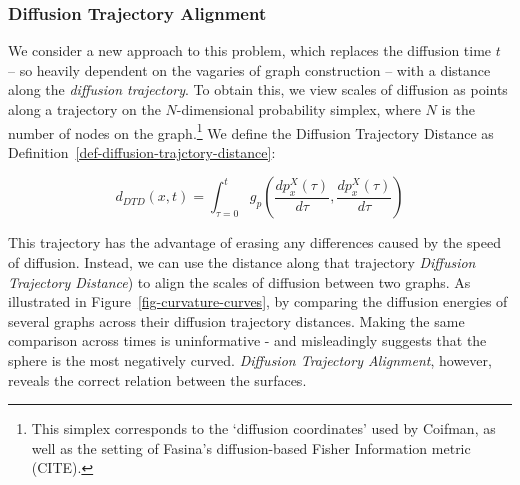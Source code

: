 \documentclass[
  letterpaper,
  DIV=11,
  numbers=noendperiod]{scrartcl}
\theoremstyle{plain}
\theoremstyle{definition}
\theoremstyle{definition}
\theoremstyle{plain}
\theoremstyle{plain}
\theoremstyle{remark}
\begin{document}
\subsubsection{Diffusion Trajectory
Alignment}\label{diffusion-trajectory-alignment}

We consider a new approach to this problem, which replaces the diffusion
time \(t\) -- so heavily dependent on the vagaries of graph construction
-- with a distance along the \emph{diffusion trajectory}. To obtain
this, we view scales of diffusion as points along a trajectory on the
\(N\)-dimensional probability simplex, where \(N\) is the number of
nodes on the graph.\footnote{This simplex corresponds to the `diffusion
  coordinates' used by Coifman, as well as the setting of Fasina's
  diffusion-based Fisher Information metric (CITE).} We define the
Diffusion Trajectory Distance as
Definition~\ref{def-diffusion-trajctory-distance}:

\[
d_{DTD}(x, t)= \int_{\tau=0}^{t} g_p\left(\frac{d p_x^X(\tau)}{d \tau}, \frac{ d p_x^X(\tau) }{d \tau} \right)
\]

This trajectory has the advantage of erasing any differences caused by
the speed of diffusion. Instead, we can use the distance along that
trajectory \emph{Diffusion Trajectory Distance}) to align the scales of
diffusion between two graphs. As illustrated in
Figure~\ref{fig-curvature-curves}, by comparing the diffusion energies
of several graphs across their diffusion trajectory distances. Making
the same comparison across times is uninformative - and misleadingly
suggests that the sphere is the most negatively curved. \emph{Diffusion
Trajectory Alignment}, however, reveals the correct relation between the
surfaces.
\end{document}
